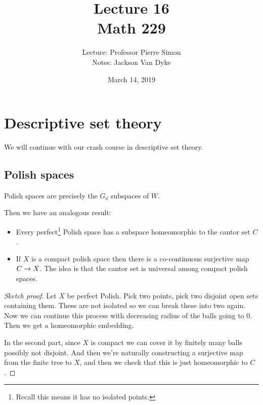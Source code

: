\documentclass{amsart}
\begin{document}
\title{Lecture 16\\Math 229}
\author{Lecture: Professor Pierre Simon\\Notes: Jackson Van Dyke}
\date{March 14, 2019}
\maketitle

\section{Descriptive set theory}

We will continue with our crash course in descriptive set theory. 

\subsection{Polish spaces}

\begin{cor}
Polish spaces are precisely the $G_{\dd}$ subspaces of $W$.
\end{cor}

Then we have an analogous result:

\begin{prop}
\begin{itemize}
\item Every perfect\footnote{Recall this means it has no isolated points.} Polish 
space has a subspace homeomorphic
to the cantor set $C$.
\item If $X$ is a compact polish space then there is a co-continuous surjective map
$C\rightarrow X$.
The idea is that the cantor set is universal among compact polish spaces. 
\end{itemize}
\end{prop}

\begin{proof}[Sketch proof]
Let $X$ be perfect Polish. Pick two points, 
pick two disjoint open sets containing them.
These are not isolated so we can break these into two again. Now we can continue this process with
decreasing radius of the balls going to $0$.
Then we get a homeomorphic embedding.

In the second part, since $X$ is compact we can cover it by finitely many balls possibly
not disjoint. And then we're naturally constructing a surjective map from the finite tree
to $X$, and then we check that this is just homeomorphic to $C$.
\end{proof}
\end{document}

